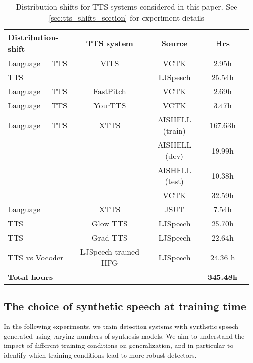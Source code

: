 \begin{table*}[htb]
    \caption{Distribution-shifts for TTS systems considered in this paper. See \autoref{sec:tts_shifts_section} for experiment details}
    \label{tab:shifty_speech_tts}
\vskip 0.15in
\begin{center}
\begin{small}
\begin{sc}
  \begin{tabular}{lcccc}
    \toprule
  Distribution-shift &  TTS system & Source& Hrs\\ 
    \midrule
   Language + TTS    & VITS & VCTK&2.95h& \\ 
   TTS  & & LJSpeech &25.54h & \\
      \hline
   Language + TTS   &  FastPitch & VCTK&2.69h & \\ 
      \hline
   Language + TTS   & YourTTS & VCTK & 3.47h & \\ 
      \hline
    Language + TTS &  XTTS & AISHELL (train)&167.63h & \\
      & & AISHELL (dev) &19.99h & \\ 
     &  & AISHELL (test) &10.38h & \\
      & & VCTK & 32.59h & \\
      \hline
      Language & XTTS & JSUT & 7.54h \\ 
      \hline
    TTS &  Glow-TTS &LJSpeech&25.70h & \\ 
      \hline
     TTS & Grad-TTS &LJSpeech & 22.64h& \\
      \hline 
    TTS vs Vocoder &  LJSpeech trained HFG & LJSpeech & 24.36 h& \\
      \hline
      \textbf{Total hours} & & & \textbf{345.48h}\\
         \bottomrule 
    \end{tabular}
    \end{sc}
\end{small}
\end{center}
\vskip -0.1in
\end{table*}
 
\subsection{The choice of synthetic speech at training time}\label{sec:exp-1}
In the following experiments, we train detection systems with synthetic speech generated using varying numbers of synthesis models. We aim to understand the impact of different training conditions on generalization, and in particular to identify which training conditions lead to more robust detectors. 

